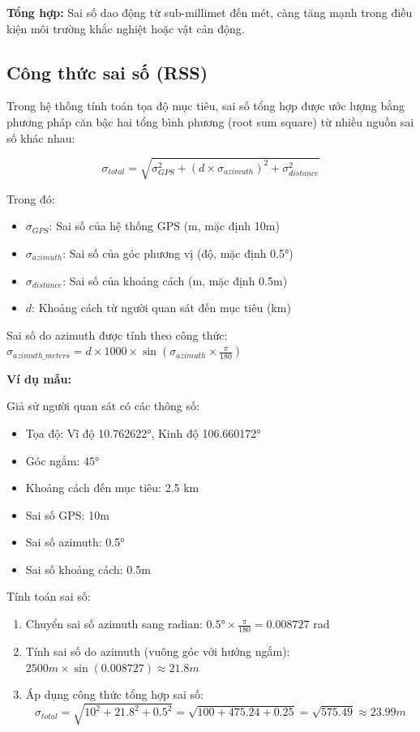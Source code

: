 \noindent\textbf{Tổng hợp:} Sai số dao động từ sub-millimet đến mét, càng tăng mạnh trong điều kiện môi trường khắc nghiệt hoặc vật cản động.

\newpage
\subsection{Công thức sai số (RSS)}

Trong hệ thống tính toán tọa độ mục tiêu, sai số tổng hợp được ước lượng bằng phương pháp căn bậc hai tổng bình phương (root sum square) từ nhiều nguồn sai số khác nhau:

$$ \sigma_{total} = \sqrt{\sigma_{GPS}^2 + (d \times \sigma_{azimuth})^2 + \sigma_{distance}^2} $$

Trong đó:
\begin{itemize}
    \item $\sigma_{GPS}$: Sai số của hệ thống GPS (m, mặc định 10m)
    \item $\sigma_{azimuth}$: Sai số của góc phương vị (độ, mặc định 0.5°)
    \item $\sigma_{distance}$: Sai số của khoảng cách (m, mặc định 0.5m)
    \item $d$: Khoảng cách từ người quan sát đến mục tiêu (km)
\end{itemize}

Sai số do azimuth được tính theo công thức: $\sigma_{azimuth\_meters} = d \times 1000 \times \sin(\sigma_{azimuth} \times \frac{\pi}{180})$

\textbf{Ví dụ mẫu:}

Giả sử người quan sát có các thông số:
\begin{itemize}
    \item Tọa độ: Vĩ độ 10.762622°, Kinh độ 106.660172°
    \item Góc ngắm: 45°
    \item Khoảng cách đến mục tiêu: 2.5 km
    \item Sai số GPS: 10m
    \item Sai số azimuth: 0.5°
    \item Sai số khoảng cách: 0.5m
\end{itemize}

Tính toán sai số:
\begin{enumerate}
    \item Chuyển sai số azimuth sang radian: $0.5° \times \frac{\pi}{180} = 0.008727$ rad
    \item Tính sai số do azimuth (vuông góc với hướng ngắm): $2500m \times \sin(0.008727) \approx 21.8m$
    \item Áp dụng công thức tổng hợp sai số: 
    $$\sigma_{total} = \sqrt{10^2 + 21.8^2 + 0.5^2} = \sqrt{100 + 475.24 + 0.25} = \sqrt{575.49} \approx 23.99m$$
\end{enumerate}

